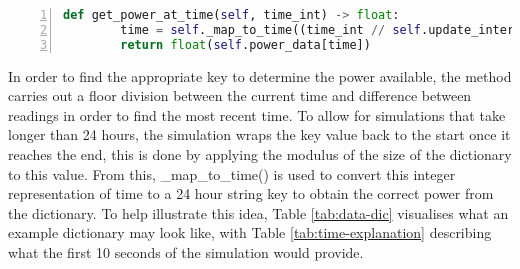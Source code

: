 \documentclass{l4proj}
\begin{document}
\begin{lstlisting}[language=python, numbers=left, caption={Example use of how a power source accesses it's available power.}, label=lst:time]
    def get_power_at_time(self, time_int) -> float:
        time = self._map_to_time((time_int // self.update_interval) % len(self.power_data))
        return float(self.power_data[time])
\end{lstlisting}

In order to find the appropriate key to determine the power available, the method carries out a floor division between the current time and difference between readings in order to find the most recent time.
To allow for simulations that take longer than 24 hours, the simulation wraps the key value back to the start once it reaches the end, this is done by applying the modulus of the size of the dictionary to this value.
From this, \_map\_to\_time() is used to convert this integer representation of time to a 24 hour string key to obtain the correct power from the dictionary.
To help illustrate this idea, Table \ref{tab:data-dic} visualises what an example dictionary may look like, with Table \ref{tab:time-explanation} describing what the first 10 seconds of the simulation would provide.
\end{document}
